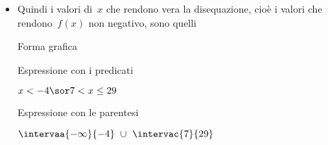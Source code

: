 \begin{esempio}
\begin{itemize}
\begin{inaccessibleblock}
  \begin{center}
  \segnofrazionea
  \end{center}
\end{inaccessibleblock}

 \item Quindi i valori di~$x$ che rendono vera la disequazione, cioè i valori
  che rendono~$f(x)$ non negativo, sono quelli 

  \begin{minipage}{.32\textwidth}
  Forma grafica\\[-1.2em]
  
\begin{inaccessibleblock}
  \begin{center}
  \solfrazionea
  \end{center}
\end{inaccessibleblock}
\vspace{.1em}

  \end{minipage}
  \begin{minipage}{.32\textwidth}
  Espressione con i predicati\\[-.3em]
  
 \begin{center}
  \(x < -4 \sor 7 < x \le 29\)
  \vspace{1em}
 \end{center}
  \end{minipage}
  \begin{minipage}{.32\textwidth}
  Espressione con le parentesi\\[-.3em]
  
 \begin{center}
  \(\intervaa{-\infty}{-4}~\cup~\intervac{7}{29}\)
  \vspace{.8em}
 \end{center}
  \end{minipage}
  
\end{itemize}

\end{esempio}

